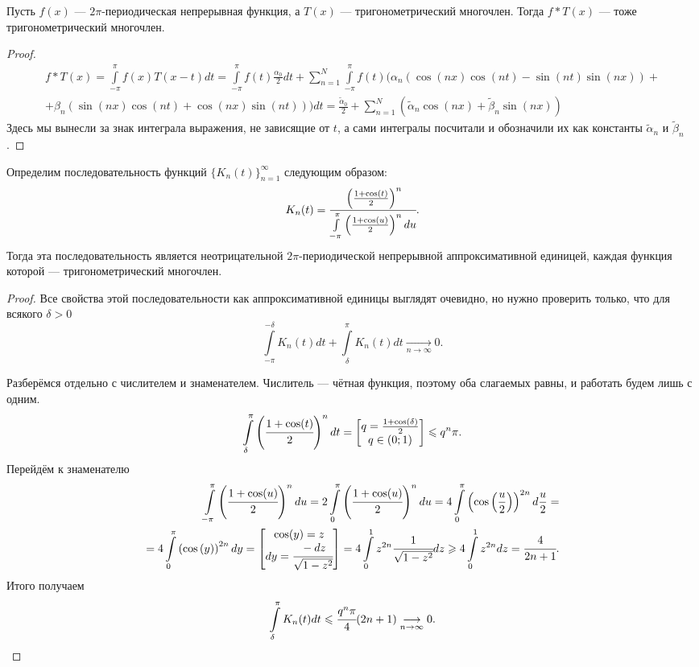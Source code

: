 \documentclass[a4paper, 12pt]{article}
\begin{document}
\begin{Lemma}
	Пусть $f(x)$ --- $2\pi$-периодическая непрерывная функция, а $T(x)$ --- тригонометрический многочлен. Тогда $f*T(x)$ --- тоже тригонометрический многочлен.
\end{Lemma}
\begin{proof}
	\begin{align*}
	f*T(x) = \int \limits_{-\pi}^{\pi}f(x)T(x - t)dt = \int \limits_{-\pi}^{\pi}f(t)\frac{\alpha_0}{2}dt +\sum\limits_{n=1}^{N} \int \limits_{-\pi}^{\pi}f(t)(\alpha_n(\cos(nx)\cos(nt) - \sin(nt)\sin(nx)) +\\+ \beta_n(\sin(nx)\cos(nt) + \cos(nx)\sin(nt)))dt = \frac{\widetilde{\alpha}_0}{2} + \sum \limits_{n=1}^{N}\left(\widetilde{\alpha}_n\cos(nx) + \widetilde{\beta}_n\sin(nx)\right)
	\end{align*}
	Здесь мы вынесли за знак интеграла выражения, не зависящие от $t$, а сами интегралы посчитали и обозначили их как константы $\widetilde{\alpha}_n$ и $\widetilde{\beta}_n$.
\end{proof}
\begin{Lemma}
	Определим последовательность функций $\{K_n(t)\}_{n=1}^{\infty}$ следующим образом:
	$$
		K_n(t) = \cfrac{\left(\frac{1+\cos(t)}{2}\right)^n}{\int\limits_{-\pi}^{\pi} \left(\frac{1 + \cos(u)}{2}\right)^ndu}.
	$$
	Тогда эта последовательность является неотрицательной $2\pi$-периодической непрерывной аппроксимативной единицей, каждая функция которой --- тригонометрический многочлен. 
\end{Lemma}
\begin{proof}
	Все свойства этой последовательности как аппроксимативной единицы выглядят очевидно, но нужно проверить только, что для всякого $\delta > 0$
	$$
		\int\limits_{-\pi}^{-\delta}K_n(t) dt + \int\limits_{\delta}^{\pi}K_n(t) dt \underset{n\to \infty}{\longrightarrow} 0.
	$$

Разберёмся отдельно с числителем и знаменателем.
Числитель --- чётная функция, поэтому оба слагаемых равны, и работать будем лишь с одним.
$$
	\int\limits_{\delta}^{\pi}\left(\cfrac{1 + \cos(t)}{2}\right)^n dt = \begin{bmatrix} q = \frac{1 + \cos(\delta)}{2}\\
	q \in (0;1)
	\end{bmatrix} \leqslant q^n\pi.
$$
Перейдём к знаменателю
\begin{align*}
	\int\limits_{-\pi}^{\pi} \left(\cfrac{1 + \cos(u)}{2}\right)^n du = 2\int\limits_{0}^{\pi} \left(\cfrac{1 + \cos(u)}{2}\right)^n du = 4 \int\limits_{0}^{\pi} \left(\cos\left(\frac{u}{2}\right)\right)^{2n} d\frac{u}{2} = \\ =
	4 \int\limits_{0}^{\pi} \left(\cos\left(y\right)\right)^{2n} dy = \begin{bmatrix}
		\cos(y) = z\\
		dy = \cfrac{-dz}{\sqrt{1 - z^2}}
		\end{bmatrix} = 4 \int\limits_{0}^{1} z^{2n} \cfrac{1}{\sqrt{1-z^2}}dz \geqslant 4\int\limits_{0}^{1} z^{2n}dz = \cfrac{4}{2n+1}.
\end{align*}
Итого получаем
$$
	\int\limits_{\delta}^{\pi}K_n(t) dt \leqslant \cfrac{q^n\pi}{4}(2n+1) \underset{n \to \infty}{\longrightarrow} 0.
$$
\end{proof}
\end{document}
